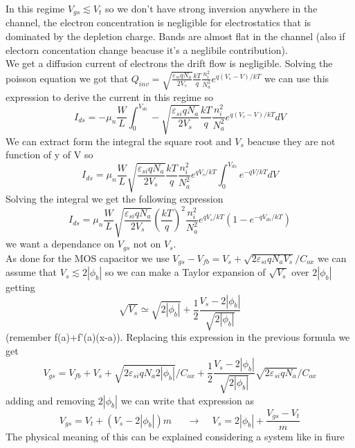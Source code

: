 In this regime $V_{gs} \lesssim V_t$ so we don't have strong inversion anywhere in the channel, the electron concentration is negligible for electrostatics that is dominated by the depletion charge. Bands are almost flat in the channel (also if electorn concentation change beacuse it's a neglibile contribution).\\
We get a diffusion current of electrons the drift flow is negligible. Solving the poisson equation we got that $Q_{inv}=\sqrt{\frac{\varepsilon_{si}qN_a}{2V_s}}\frac{kT}{q}\frac{n_i^2}{N_a^2}e^{q(V_s-V)/kT}$ we can use this expression to derive the current in this regime so 
\begin{equation}
I_{ds}=-\mu_n \frac{W}{L}\int^{V_{ds}}_0-\sqrt{\frac{\varepsilon_{si}qN_a}{2V_s}}\frac{kT}{q}\frac{n_i^2}{N_a^2}e^{q(V_s-V)/kT}dV
\end{equation}
We can extract form the integral the square root and $V_s$ beacuse they are not function of y of V so 
\begin{equation}
I_{ds}=\mu_n \frac{W}{L}\sqrt{\frac{\varepsilon_{si}qN_a}{2V_s}}\frac{kT}{q}\frac{n_i^2}{N_a^2}e^{qV_s/kT}\int^{V_{ds}}_0e^{-qV/kT}dV
\end{equation}
Solving the integral we get the following expression
\begin{equation}
I_{ds}=\mu_n \frac{W}{L}\sqrt{\frac{\varepsilon_{si}qN_a}{2V_s}}\left(\frac{kT}{q}\right)^2\frac{n_i^2}{N_a^2}e^{qV_s/kT}\left(1-e^{-qV_{ds}/kT}\right)
\end{equation}
we want a dependance on $V_{gs}$ not on $V_s$.\\
As done for the MOS capacitor we use $V_{gs}-V_{fb}=V_s+\sqrt{2\varepsilon_{si}qN_aV_s}/C_{ox}$ we can assume that $V_s \lesssim 2|\phi_b|$ so we can make a Taylor expansion of $\sqrt{V_s}$ over $2|\phi_b|$ getting 
\begin{equation}
\sqrt{V_s}\simeq \sqrt{2|\phi_b|}+\frac{1}{2}\frac{V_{s}-2|\phi_b|}{\sqrt{2|\phi_b|}}
\end{equation}
(remember f(a)+f'(a)(x-a)). Replacing this expression in the previous formula we get 
\begin{equation}
V_{gs}=V_{fb}+V_s+\sqrt{2\varepsilon_{si}qN_a2|\phi_b|}/C_{ox}+\frac{1}{2}\frac{V_{s}-2|\phi_b|}{\sqrt{2|\phi_b|}}\sqrt{2\varepsilon_{si}qN_a}/C_{ox}
\end{equation}
adding and removing $2|\phi_b|$ we can write that expression as 
\begin{equation}
V_{gs}=V_t+(V_s-2|\phi_b|)m\ \ \ \ \ \ \ \rightarrow \ \ \ \ \ V_{s}=2|\phi_b|+\frac{V_{gs}-V_t}{m}
\end{equation}
The physical meaning of this can be explained considering a system like in fiure\\

